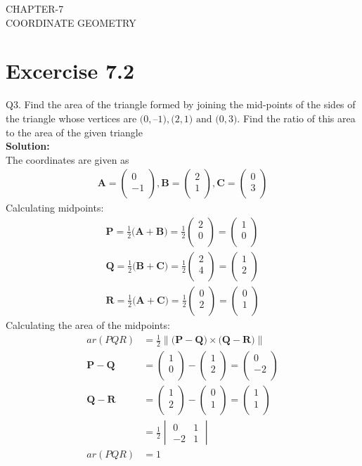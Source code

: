 \documentclass[12pt]{article}
\newcommand{\mydet}[1]{\ensuremath{\begin{vmatrix}#1\end{vmatrix}}}
\providecommand{\norm}[1]{\left\lVert#1\right\rVert}
\newcommand{\solution}{\noindent \textbf{Solution: }}
\newcommand{\myvec}[1]{\ensuremath{\begin{pmatrix}#1\end{pmatrix}}}
\let\vec\mathbf
\begin{document}
\begin{center}
\textbf\large{CHAPTER-7 \\ COORDINATE GEOMETRY}
\end{center}
\section*{Excercise 7.2}

Q3. Find the area of the triangle formed by joining the mid-points of the sides of the triangle
whose vertices are $\vec(0, –1), \vec(2, 1) \text{ and } \vec(0, 3)$. Find the ratio of this area to the area of the
given triangle
\\
\solution
\\
The coordinates are given as
	\begin{align}
	\vec{A} = \myvec{
		0\\
		-1\\
		},
	\vec{B} = \myvec{
		2\\
		1\\
		},
	\vec{C} = \myvec{
		0\\
		3\\
		}
	\end{align}
Calculating midpoints:
	\begin{align}
		\vec{P} = \frac{1}{2}\vec(\vec{A}+\vec{B}) = \frac{1}{2}\myvec{2\\0\\} = \myvec{1\\0\\}\\
		\vec{Q} = \frac{1}{2}\vec(\vec{B}+\vec{C}) = \frac{1}{2}\myvec{2\\4\\} = \myvec{1\\2\\}\\
		\vec{R} = \frac{1}{2}\vec(\vec{A}+\vec{C}) = \frac{1}{2}\myvec{0\\2\\} = \myvec{0\\1\\}
	\end{align}
Calculating the area of the midpoints:
	\begin{align}
		ar(PQR)&=\frac{1}{2}{\norm{\vec(\vec{P}-\vec{Q})\times\vec(\vec{Q}-\vec{R})}}\\
		\vec{P}-\vec{Q} &=  \myvec{
  1 \\
  0 \\
 } - \myvec{
  1 \\
  2 \\
 } = \myvec{
 0 \\
 -2 \\
 }
		\\
		\vec{Q}-\vec{R} &=  \myvec{
  1 \\
  2 \\
 } - \myvec{
  0 \\
  1 \\
 } = \myvec{
 1 \\
 1 \\
 }
 \\
		&=\frac{1}{2}\mydet{0 & 1\\-2 & 1}\\
		ar(PQR)&=1
	\end{align}
\end{document}
